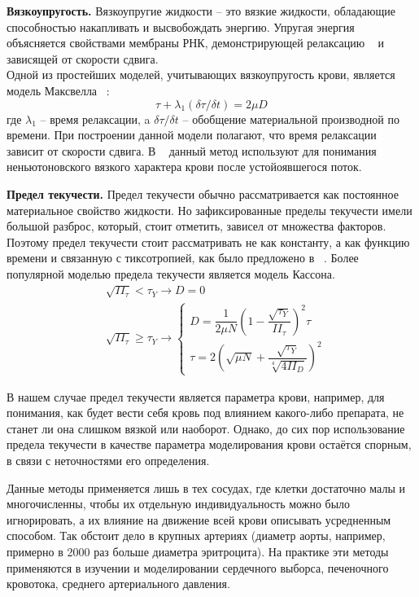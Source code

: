 \textbf{Вязкоупругость.}
Вязкоупругие жидкости -- это вязкие жидкости, обладающие способностью накапливать и высвобождать энергию. Упругая энергия объясняется свойствами мембраны РНК, демонстрирующей релаксацию ~\cite{evans:1976} и зависящей от скорости сдвига.\\
Одной из простейших моделей, учитывающих вязкоупругость крови, является модель Максвелла ~\cite{thurston:1972}:
$$\tau+\lambda_1(\delta\tau / \delta t)=2\mu D$$  где 
$\lambda_1$ -- время релаксации, a 
$\delta\tau / \delta t$ -- обобщение материальной производной по времени.
При построении данной модели полагают, что время релаксации зависит от скорости сдвига.
В ~\cite{thurston:1994} данный метод используют для понимания неньютоновского вязкого характера крови после устойоявшегося поток.

\textbf{Предел текучести.}
Предел текучести обычно рассматривается как постоянное материальное свойство жидкости. Но зафиксированные пределы текучести имели большой разброс, который, стоит отметить, зависел от множества факторов.
Поэтому предел текучести стоит рассматривать не как константу, а как функцию времени и связанную с тиксотропией, как было предложено в ~\cite{moller:2006}.
Более популярной моделью предела текучести является модель Кассона.
$$
\begin{aligned}
	&\sqrt{II_\tau} < \tau_Y\longrightarrow D=0 \\
	&\sqrt{II_\tau} \geq \tau_Y\longrightarrow
	\begin{cases}
		D   = \dfrac{1}{2\mu N}\left(1-\dfrac{\sqrt{\tau_Y}}{II_\tau}\right)^2\tau \\[10pt]
		\tau= 2\left(\sqrt{\mu N}+\dfrac{\sqrt{\tau_Y}}{\sqrt[4]{4II_D}}\right)^2
	\end{cases}
\end{aligned}
$$

В нашем случае предел текучести является параметра крови, например, для понимания, как будет вести себя кровь под влиянием какого-либо препарата, не станет ли она слишком вязкой или наоборот.
Однако, до сих пор использование предела текучести в качестве параметра моделирования крови остаётся спорным, в связи с неточностями его определения.

Данные методы применяется лишь в тех сосудах, где клетки достаточно малы и многочисленны, чтобы их отдельную индивидуальность можно было игнорировать, а их влияние на движение всей крови описывать усредненным способом. Так обстоит дело в крупных артериях (диаметр аорты, например, примерно в 2000 раз больше диаметра эритроцита). 
На практике эти методы применяются в изучении и моделировании сердечного выборса, печеночного кровотока, среднего артериального давления.

